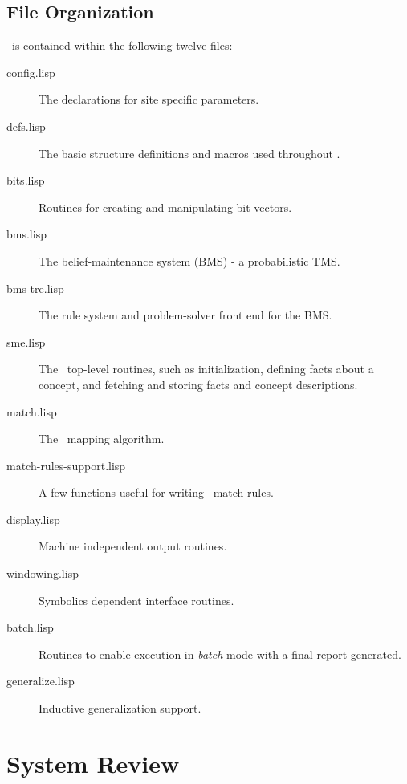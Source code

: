 \subsection{File Organization}

\SME\ is contained within the following twelve files:

\begin{description}
 \item[config.lisp]  The declarations for site specific
parameters.
 \item[defs.lisp]  The basic structure definitions and macros used throughout
\SME. 
 \item[bits.lisp]  Routines for creating and manipulating bit vectors.
 \item[bms.lisp]  The belief-maintenance system (BMS) - a probabilistic TMS.
 \item[bms-tre.lisp]  The rule system and problem-solver front end for the BMS.
 \item[sme.lisp]  The \SME\ top-level routines, such as initialization,
defining facts about a concept, and fetching and storing facts and concept
descriptions.
 \item[match.lisp]  The \SME\ mapping algorithm.
 \item[match-rules-support.lisp]  A few functions useful for writing \SME\
match rules.
 \item[display.lisp]  Machine independent output routines.
 \item[windowing.lisp]  Symbolics dependent interface routines.
 \item[batch.lisp]  Routines to enable execution in {\it batch} mode with a
final report generated.
 \item[generalize.lisp]  Inductive generalization support.
\end{description}


\section{System Review}

